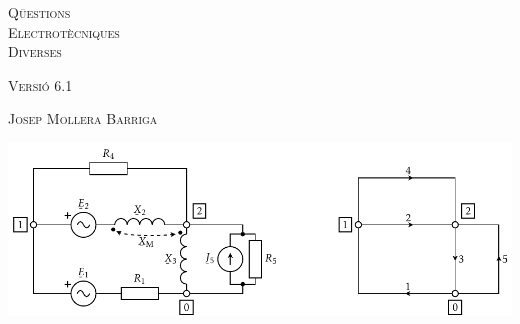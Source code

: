\begin{titlepage}

   \parbox{18cm}{\fontsize{60pt}{60pt}\selectfont\color{NavyBlue}\scshape%
                 Q\"{u}estions\\[30pt] Electrot\`{e}cniques\\[30pt] Diverses}

   \vspace*{1.8cm}
   {\fontsize{30pt}{30pt}\selectfont\textsc{Versi\'{o} 6.1}}

   \vspace*{2cm}
   {\fontsize{40pt}{40pt}\selectfont\textsc{Josep Mollera Barriga}}

   \vspace*{3cm}
   \includegraphics{Imatges/Cap-ResXarxElec-Circuit-Graf.pdf}

\end{titlepage}
